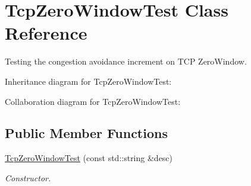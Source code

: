 \hypertarget{classTcpZeroWindowTest}{}\section{Tcp\+Zero\+Window\+Test Class Reference}
\label{classTcpZeroWindowTest}


Testing the congestion avoidance increment on T\+CP Zero\+Window.  




Inheritance diagram for Tcp\+Zero\+Window\+Test\+:


Collaboration diagram for Tcp\+Zero\+Window\+Test\+:
\subsection*{Public Member Functions}
\begin{DoxyCompactItemize}
\item 
\hyperlink{classTcpZeroWindowTest_aa59bd9ff03d3ed74df10fd796e823fa5}{Tcp\+Zero\+Window\+Test} (const std\+::string \&desc)
\begin{DoxyCompactList}\small\item\em Constructor. \end{DoxyCompactList}\end{DoxyCompactItemize}
